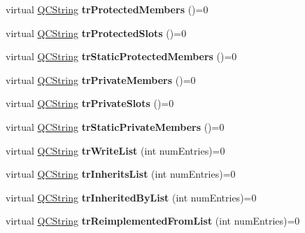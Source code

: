 \begin{DoxyCompactItemize}
virtual \mbox{\hyperlink{class_q_c_string}{Q\+C\+String}} {\bfseries tr\+Protected\+Members} ()=0
\item 
\mbox{\label{class_translator_a5259c79b898160c0c23b17b9dccb785a}} 
virtual \mbox{\hyperlink{class_q_c_string}{Q\+C\+String}} {\bfseries tr\+Protected\+Slots} ()=0
\item 
\mbox{\label{class_translator_a9996790ddc011f76b9305fdee0d54534}} 
virtual \mbox{\hyperlink{class_q_c_string}{Q\+C\+String}} {\bfseries tr\+Static\+Protected\+Members} ()=0
\item 
\mbox{\label{class_translator_a1567e42b2461ef41cd5baa346ee0aee2}} 
virtual \mbox{\hyperlink{class_q_c_string}{Q\+C\+String}} {\bfseries tr\+Private\+Members} ()=0
\item 
\mbox{\label{class_translator_a1db1cd6e798b4dfadcdb3b11e6623632}} 
virtual \mbox{\hyperlink{class_q_c_string}{Q\+C\+String}} {\bfseries tr\+Private\+Slots} ()=0
\item 
\mbox{\label{class_translator_a6328b8e557a9f3d364f1eff1ae2854d1}} 
virtual \mbox{\hyperlink{class_q_c_string}{Q\+C\+String}} {\bfseries tr\+Static\+Private\+Members} ()=0
\item 
\mbox{\label{class_translator_a31e719b4e290a359ddbb78132bf3f494}} 
virtual \mbox{\hyperlink{class_q_c_string}{Q\+C\+String}} {\bfseries tr\+Write\+List} (int num\+Entries)=0
\item 
\mbox{\label{class_translator_a837ce455893cb96869ab2cd7c049b729}} 
virtual \mbox{\hyperlink{class_q_c_string}{Q\+C\+String}} {\bfseries tr\+Inherits\+List} (int num\+Entries)=0
\item 
\mbox{\label{class_translator_ac285a2e20bd3f084e02fbcc43c3e0caa}} 
virtual \mbox{\hyperlink{class_q_c_string}{Q\+C\+String}} {\bfseries tr\+Inherited\+By\+List} (int num\+Entries)=0
\item 
\mbox{\label{class_translator_ab4194f85d265659e3b0a962e3d2050f7}} 
virtual \mbox{\hyperlink{class_q_c_string}{Q\+C\+String}} {\bfseries tr\+Reimplemented\+From\+List} (int num\+Entries)=0

\end{DoxyCompactItemize}
